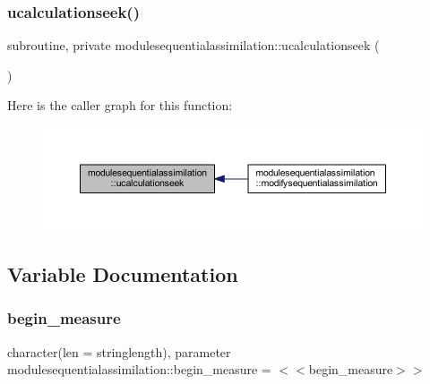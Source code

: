 \subsubsection{\texorpdfstring{ucalculationseek()}{ucalculationseek()}}
{\footnotesize\ttfamily subroutine, private modulesequentialassimilation\+::ucalculationseek (\begin{DoxyParamCaption}{ }\end{DoxyParamCaption})\hspace{0.3cm}{\ttfamily [private]}}

Here is the caller graph for this function\+:\nopagebreak
\begin{figure}[H]
\begin{center}
\leavevmode
\includegraphics[width=350pt]{namespacemodulesequentialassimilation_a413c75d9b44cd4a5fdf9caf890550305_icgraph}
\end{center}
\end{figure}


\subsection{Variable Documentation}
\mbox{\label{namespacemodulesequentialassimilation_a77da16ccbaea28106a79c214310680da}} 
\subsubsection{\texorpdfstring{begin\+\_\+measure}{begin\_measure}}
{\footnotesize\ttfamily character(len = stringlength), parameter modulesequentialassimilation\+::begin\+\_\+measure = \textquotesingle{}$<$$<$begin\+\_\+measure$>$$>$\textquotesingle{}\hspace{0.3cm}{\ttfamily [private]}}

\mbox{\label{namespacemodulesequentialassimilation_ad4132c410b5be746f6b8bde4d0189f58}} 
